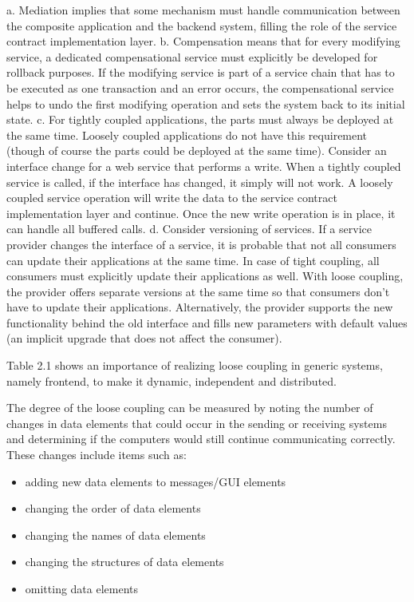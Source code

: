 a. Mediation implies that some mechanism must handle communication between the composite application and the backend system, filling the role of the service contract implementation layer.
\newline
b. Compensation means that for every modifying service, a dedicated compensational service must explicitly be developed for rollback purposes. If the modifying service is part of a service chain that has to be executed as one transaction and an error occurs, the compensational service helps to undo the first modifying operation and sets the system back to its initial state. 
\newline
c. For tightly coupled applications, the parts must always be deployed at the same time. Loosely coupled applications do not have this requirement (though of course the parts could be deployed at the same time). Consider an interface change for a web service that performs a write. When a tightly coupled service is called, if the interface has changed, it simply will not work. A loosely coupled service operation will write the data to the service contract implementation layer and continue. Once the new write operation is in place, it can handle all buffered calls. 
\newline
d. Consider versioning of services. If a service provider changes the interface of a service, it is probable that not all consumers can update their applications at the same time. In case of tight coupling, all consumers must explicitly update their applications as well. With loose coupling, the provider offers separate versions at the same time so that consumers don't have to update their applications. Alternatively, the provider supports the new functionality behind the old interface and fills new parameters with default values (an implicit upgrade that does not affect the consumer).

Table 2.1 shows an importance of realizing loose coupling in generic systems, namely frontend, to make it dynamic, independent and distributed.

The degree of the loose coupling can be measured by noting the number of changes in data elements that could occur in the sending or receiving systems and determining if the computers would still continue communicating correctly\cite{firestone1984study,danneels2003tight}. These changes include items such as:
\begin{itemize}
\item adding new data elements to messages/GUI elements
\item changing the order of data elements
\item changing the names of data elements
\item changing the structures of data elements
\item omitting data elements
\end{itemize}


